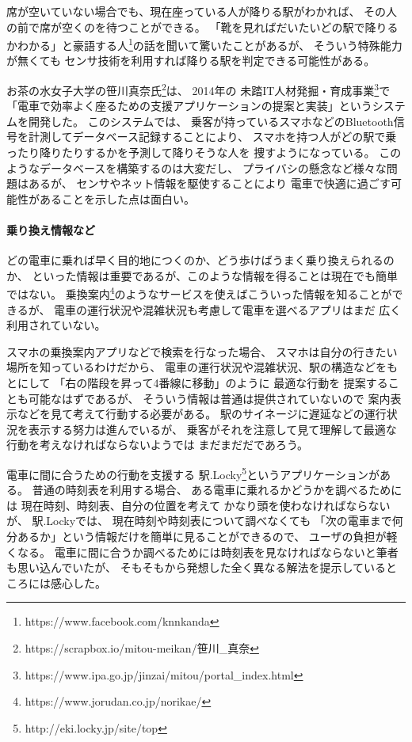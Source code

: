 \documentclass[twocolumn,10pt]{jarticle}
\begin{document}
席が空いていない場合でも、現在座っている人が降りる駅がわかれば、
その人の前で席が空くのを待つことができる。
「靴を見ればだいたいどの駅で降りるかわかる」と豪語する人\footnote{
  \textsf{https://www.facebook.com/knnkanda}
}の話を聞いて驚いたことがあるが、
そういう特殊能力が無くても
センサ技術を利用すれば降りる駅を判定できる可能性がある。

お茶の水女子大学の笹川真奈氏\footnote{
  \textsf{https://scrapbox.io/mitou-meikan/笹川\_真奈}
}は、
2014年の
未踏IT人材発掘・育成事業\footnote{
  \textsf{https://www.ipa.go.jp/jinzai/mitou/portal\_index.html}
}で「電車で効率よく座るための支援アプリケーションの提案と実装」というシステムを開発した。
このシステムでは、
乗客が持っているスマホなどのBluetooth信号を計測してデータベース記録することにより、
スマホを持つ人がどの駅で乗ったり降りたりするかを予測して降りそうな人を
捜すようになっている。
このようなデータベースを構築するのは大変だし、
プライバシの懸念など様々な問題はあるが、
センサやネット情報を駆使することにより
電車で快適に過ごす可能性があることを示した点は面白い。

\paragraph{乗り換え情報など}
  
どの電車に乗れば早く目的地につくのか、どう歩けばうまく乗り換えられるのか、
といった情報は重要であるが、このような情報を得ることは現在でも簡単ではない。
乗換案内\footnote{
  \textsf{https://www.jorudan.co.jp/norikae/}
}のようなサービスを使えばこういった情報を知ることができるが、
電車の運行状況や混雑状況も考慮して電車を選べるアプリはまだ
広く利用されていない。

スマホの乗換案内アプリなどで検索を行なった場合、
スマホは自分の行きたい場所を知っているわけだから、
電車の運行状況や混雑状況、駅の構造などをもとにして
「右の階段を昇って4番線に移動」のように 最適な行動を
提案することも可能なはずであるが、
そういう情報は普通は提供されていないので
案内表示などを見て考えて行動する必要がある。
駅のサイネージに遅延などの運行状況を表示する努力は進んでいるが、
乗客がそれを注意して見て理解して最適な行動を考えなければならないようでは
まだまだだであろう。

電車に間に合うための行動を支援する
駅.Locky\footnote{
  \textsf{http://eki.locky.jp/site/top}
}というアプリケーションがある。
普通の時刻表を利用する場合、
ある電車に乗れるかどうかを調べるためには
現在時刻、時刻表、自分の位置を考えて
かなり頭を使わなければならないが、
駅.Lockyでは、
現在時刻や時刻表について調べなくても
「次の電車まで何分あるか」という情報だけを簡単に見ることができるので、
ユーザの負担が軽くなる。
電車に間に合うか調べるためには時刻表を見なければならないと筆者も思い込んでいたが、
そもそもから発想した全く異なる解法を提示しているところには感心した。
\end{document}
